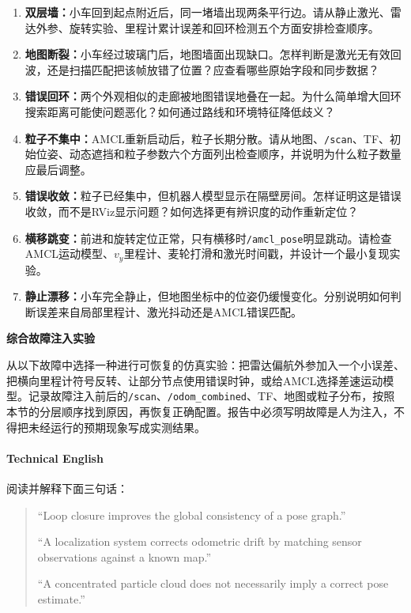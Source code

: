 \documentclass[UTF8,zihao=-4]{ctexart}
\DeclareRobustCommand{\code}[1]{\texttt{#1}}
\begin{document}
\begin{enumerate}
  \item \textbf{双层墙：}小车回到起点附近后，同一堵墙出现两条平行边。请从静止激光、雷达外参、旋转实验、里程计累计误差和回环检测五个方面安排检查顺序。
  \item \textbf{地图断裂：}小车经过玻璃门后，地图墙面出现缺口。怎样判断是激光无有效回波，还是扫描匹配把该帧放错了位置？应查看哪些原始字段和同步数据？
  \item \textbf{错误回环：}两个外观相似的走廊被地图错误地叠在一起。为什么简单增大回环搜索距离可能使问题恶化？如何通过路线和环境特征降低歧义？
  \item \textbf{粒子不集中：}AMCL重新启动后，粒子长期分散。请从地图、\code{/scan}、TF、初始位姿、动态遮挡和粒子参数六个方面列出检查顺序，并说明为什么粒子数量应最后调整。
  \item \textbf{错误收敛：}粒子已经集中，但机器人模型显示在隔壁房间。怎样证明这是错误收敛，而不是RViz显示问题？如何选择更有辨识度的动作重新定位？
  \item \textbf{横移跳变：}前进和旋转定位正常，只有横移时\code{/amcl\_pose}明显跳动。请检查AMCL运动模型、$v_y$里程计、麦轮打滑和激光时间戳，并设计一个最小复现实验。
  \item \textbf{静止漂移：}小车完全静止，但地图坐标中的位姿仍缓慢变化。分别说明如何判断误差来自局部里程计、激光抖动还是AMCL错误匹配。
\end{enumerate}

\textbf{综合故障注入实验}

从以下故障中选择一种进行可恢复的仿真实验：把雷达偏航外参加入一个小误差、把横向里程计符号反转、让部分节点使用错误时钟，或给AMCL选择差速运动模型。记录故障注入前后的\code{/scan}、\code{/odom\_combined}、TF、地图或粒子分布，按照本节的分层顺序找到原因，再恢复正确配置。报告中必须写明故障是人为注入，不得把未经运行的预期现象写成实测结果。

\paragraph{Technical English}
阅读并解释下面三句话：

\begin{quote}
``Loop closure improves the global consistency of a pose graph.''

``A localization system corrects odometric drift by matching sensor observations against a known map.''

``A concentrated particle cloud does not necessarily imply a correct pose estimate.''
\end{quote}
\end{document}
